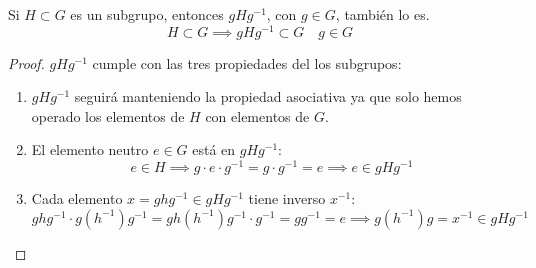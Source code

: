 \begin{thm}
    Si $H \subset G$ es un subgrupo, entonces $gHg^{-1}$, con $g \in G$, también lo es.
    \begin{equation}
        H \subset G \implies gHg^{-1} \subset G \quad g \in G 
    \end{equation}
\end{thm}

\begin{proof}
    $gHg^{-1}$ cumple con las tres propiedades del los subgrupos:
    \begin{enumerate}
        \item $gHg^{-1}$ seguirá manteniendo la propiedad asociativa ya que solo hemos operado los elementos de $H$ con elementos de $G$.
        \item El elemento neutro $e\in G$ está en $gHg^{-1}$:
        \begin{equation}
            e \in H \implies g \cdot e \cdot g^{-1} = g \cdot g^{-1} = e \implies e \in gHg^{-1}
        \end{equation}
    \item Cada elemento $x = ghg^{-1} \in gHg^{-1}$ tiene inverso $x^{-1}$:
        \begin{equation}
            ghg^{-1} \cdot g(h^{-1})g^{-1}    = gh (h^{-1})g^{-1} \cdot g^{-1} = g g^{-1} = e \implies g(h^{-1})g = x^{-1} \in gHg^{-1}       
        \end{equation}
    \end{enumerate}
\end{proof}
